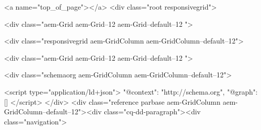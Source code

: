         






<a name="top_of_page"></a>
<div class="root responsivegrid">


<div class="aem-Grid aem-Grid--12 aem-Grid--default--12 ">
    
    <div class="responsivegrid aem-GridColumn aem-GridColumn--default--12">


<div class="aem-Grid aem-Grid--12 aem-Grid--default--12 ">
    
    <div class="schemaorg aem-GridColumn aem-GridColumn--default--12">
    


<script type="application/ld+json">
    {"@context": "http://schema.org", "@graph":[]}
</script>
</div>
<div class="reference parbase aem-GridColumn aem-GridColumn--default--12"><div class="cq-dd-paragraph"><div class="navigation">
    









